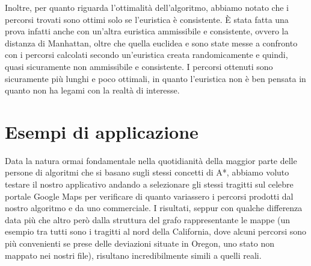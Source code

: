 \documentclass[12pt,a4paper]{report}
\begin{document}
Inoltre, per quanto riguarda l'ottimalità dell'algoritmo, abbiamo notato che i percorsi trovati sono ottimi solo se l'euristica è consistente. È stata fatta una prova infatti anche con un'altra euristica ammissibile e consistente, ovvero la distanza di Manhattan, oltre che quella euclidea e sono state messe a confronto con i percorsi calcolati secondo un'euristica creata randomicamente e quindi, quasi sicuramente non ammissibile e consistente.
I percorsi ottenuti sono sicuramente più lunghi e poco ottimali, in quanto l'euristica non è ben pensata in quanto non ha legami con la realtà di interesse. 

\chapter{Esempi di applicazione}

Data la natura ormai fondamentale nella quotidianità della maggior parte delle persone di algoritmi che si basano sugli stessi concetti di A*, abbiamo voluto testare il nostro applicativo andando a selezionare gli stessi tragitti sul celebre portale Google Maps per verificare di quanto variassero i percorsi prodotti dal nostro algoritmo e da uno commerciale. I risultati, seppur con qualche differenza data più che altro però dalla struttura del grafo rappresentante le mappe (un esempio tra tutti sono i tragitti al nord della California, dove alcuni percorsi sono più convenienti se prese delle deviazioni situate in Oregon, uno stato non mappato nei nostri file), risultano incredibilmente simili a quelli reali.
\end{document}
